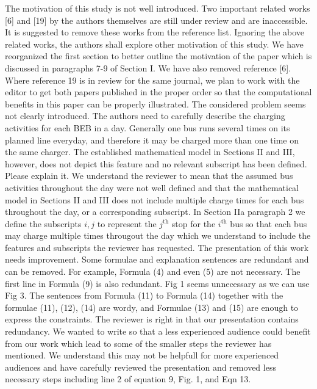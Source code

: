 \documentclass{article}
\begin{document}
\begin{buttkissing}
	\reviewerclaims The motivation of this study is not well introduced. Two important related works [6] and [19] by the authors themselves are still under review and are inaccessible. It is suggested to remove these works from the reference list. Ignoring the above related works, the authors shall explore other motivation of this study.
	\kissbutt We have reorganized the first section to better outline the motivation of the paper which is discussed in paragraphs 7-9 of Section I. We have also removed reference [6]. Where reference 19 is in review for the same journal, we plan to work with the editor to get both papers published in the proper order so that the computational benefits in this paper can be properly illustrated.  
	\reviewerclaims The considered problem seems not clearly introduced. The authors need to carefully describe the charging activities for each BEB in a day. Generally one bus runs several times on its planned line everyday, and therefore it may be charged more than one time on the same charger. The established mathematical model in Sections II and III, however, does not depict this feature and no relevant subscript has been defined. Please explain it.
	\kissbutt We understand the reviewer to mean that the assumed bus activities throughout the day were not well defined and that the mathematical model in Sections II and III does not include multiple charge times for each bus throughout the day, or a corresponding subscript. In Section IIa paragraph 2 we define the subscripts $i,j$ to represent the $j^{\text{th}}$ stop for the $i^{\text{th}}$ bus so that each bus may charge multiple times througout the day which we understand to include the features and subscripts the reviewer has requested.  
	\reviewerclaims The presentation of this work needs improvement. Some formulae and explanation sentences are redundant and can be removed. For example, Formula (4) and even (5) are not necessary. The first line in Formula (9) is also redundant. Fig 1 seems unnecessary as we can use Fig 3. The sentences from Formula (11) to Formula (14) together with the formulae (11), (12), (14) are wordy, and Formulae (13) and (15) are enough to express the constraints.
	\kissbutt The reviewer is right in that our presentation contains redundancy.  We wanted to write so that a less experienced audience could benefit from our work which lead to some of the smaller steps the reviewer has mentioned.  We understand this may not be helpfull for more experienced audiences and have carefully reviewed the presentation and removed less necessary steps including line 2 of equation 9, Fig. 1, and Eqn 13.  

\end{buttkissing}
\end{document}

